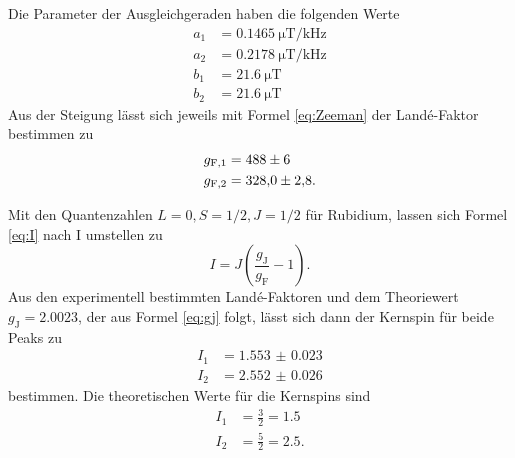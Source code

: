 Die Parameter der Ausgleichgeraden haben die folgenden Werte
\begin{align*}
    a_1 &= \SI{0.1465}{\micro\tesla\per\kilo\hertz} \\ %
    a_2 &= \SI{0.2178}{\micro\tesla\per\kilo\hertz} \\
    b_1 &= \SI{21.6}{\micro\tesla} \\
    b_2 &= \SI{21.6}{\micro\tesla}
\end{align*}
Aus der Steigung lässt sich jeweils mit Formel \ref{eq:Zeeman} der Landé-Faktor bestimmen zu
\begin{align*}
    g_{\text{F},1} &= \num{488 \pm 6} \\
    g_{\text{F},2} &= \num{328 \pm 2.8}.
\end{align*}

Mit den Quantenzahlen $L = 0, S = 1/2, J = 1/2$ für Rubidium, lassen sich Formel \ref{eq:I} nach I umstellen zu
\begin{equation*}
    I = J (\frac{g_\text{J}}{g_\text{F}} -1).
\end{equation*} 
Aus den experimentell bestimmten Landé-Faktoren und dem Theoriewert $g_\text{J} = \num{2.0023}$, der aus Formel \ref{eq:gj} folgt, lässt sich dann der Kernspin für beide Peaks zu
\begin{align*}
    I_1 &= \num{1.553(23)} \\
    I_2 &= \num{2.552(26)}
\end{align*}
bestimmen. 
Die theoretischen Werte für die Kernspins sind
\begin{align*}
    I_1 &= \frac{3}{2} = \num{1.5} \\
    I_2 &= \frac{5}{2} = \num{2.5}.
\end{align*}


